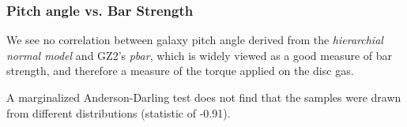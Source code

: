\subsubsection{Pitch angle vs. Bar Strength}
We see no correlation between galaxy pitch angle derived from the \textit{hierarchial normal model} and GZ2's \textit{pbar}, which is widely viewed as a good measure of bar strength, and therefore a measure of the torque applied on the disc gas.

A marginalized Anderson-Darling test does not find that the samples were drawn from different distributions (statistic of -0.91).
